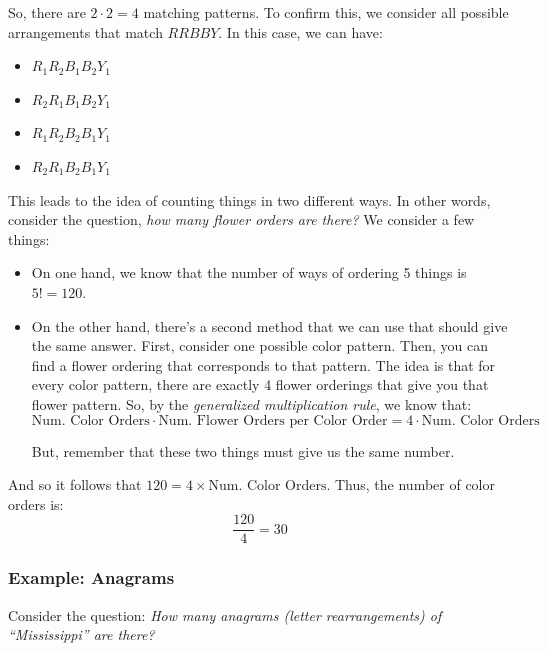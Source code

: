 \documentclass[letterpaper]{article}
\begin{document}
\begin{itemize}
    So, there are $2 \cdot 2 = 4$ matching patterns. To confirm this, we consider all possible arrangements that match $RRBBY$. In this case, we can have:
    \begin{itemize}
        \item $R_1 R_2 B_1 B_2 Y_1$
        \item $R_2 R_1 B_1 B_2 Y_1$
        \item $R_1 R_2 B_2 B_1 Y_1$
        \item $R_2 R_1 B_2 B_1 Y_1$
    \end{itemize}
    
    This leads to the idea of counting things in two different ways. In other words, consider the question, \emph{how many flower orders are there?} We consider a few things:
    \begin{itemize}
        \item On one hand, we know that the number of ways of ordering 5 things is $5! = 120$. 
        \item On the other hand, there's a second method that we can use that should give the same answer. First, consider one possible color pattern. Then, you can find a flower ordering that corresponds to that pattern. The idea is that for every color pattern, there are exactly 4 flower orderings that give you that flower pattern. So, by the \emph{generalized multiplication rule}, we know that:
        \[ \text{Num. Color Orders} \cdot \text{Num. Flower Orders per Color Order} = 4 \cdot \text{Num. Color Orders} \]
    
        But, remember that these two things must give us the same number. 
    \end{itemize}
    And so it follows that $120 = 4 \times \text{Num. Color Orders}$. Thus, the number of color orders is:
    \[\frac{120}{4} = \boxed{30}\]
\end{itemize}

\subsubsection{Example: Anagrams}
Consider the question: \emph{How many anagrams (letter rearrangements) of ``Mississippi'' are there?}
\end{document}

